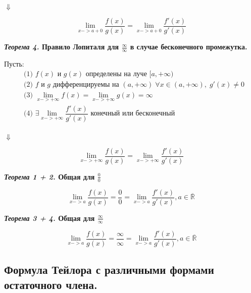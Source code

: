 \documentclass[a4paper,12pt]{article}
\theoremstyle{plain} %
\theoremstyle{definition} %
\theoremstyle{remark} %
\begin{document}
\begin{center}
	$\Downarrow$
\end{center}

\[\lim_{x-> a + 0} \dfrac{f(x)}{g(x)} =\lim_{x-> a + 0 } \dfrac{f'(x)}{g'(x)} \]



\textbf{\textit{Теорема 4.} Правило Лопиталя для $\frac{\infty}{\infty}$ в случае бесконечного промежутка.}

Пусть:
\begin{equation*}
	\begin{aligned}
		 & \text{(1) } f(x) \text{ и } g(x) \text{ определены на луче }[a, +\infty)                                            \\
		 & \text{(2) } f \text{ и } g \text{ дифференцируемы на } (a, +\infty)  \; \forall x \in (a, +\infty), \; g'(x) \neq 0 \\
		 & \text{(3) }  \lim_{x-> + \infty} f(x) =  \lim_{x-> +\infty} g(x) = \infty                                           \\
		 & \text{(4) }  \exists \lim_{x-> +\infty } \dfrac{f'(x)}{g'(x)} \text{ конечный или бесконечный }                     \\
	\end{aligned}
\end{equation*}

\begin{center}
	$\Downarrow$
\end{center}

\[\lim_{x-> + \infty} \dfrac{f(x)}{g(x)} =\lim_{x-> + \infty } \dfrac{f'(x)}{g'(x)} \]

\textbf{\textit{Теорема 1 + 2.} Общая для $\frac{0}{0}$}

\[
	\lim_{x -> a} \frac{f(x)}{g(x)} = \frac{0}{0} = \lim_{x->a} \frac{f'(x)}{g'(x)}, a \in \overline{ \mathbb{R}}
\]



\textbf{\textit{Теорема 3 + 4.} Общая для $\frac{\infty}{\infty}$}

\[
	\lim_{x -> a} \frac{f(x)}{g(x)} = \frac{\infty}{\infty} = \lim_{x->a} \frac{f'(x)}{g'(x)}, a \in \overline{ \mathbb{R}}
\]



\newpage

\subsection*{Формула Тейлора с различными формами остаточного члена.                                   }
\end{document}
